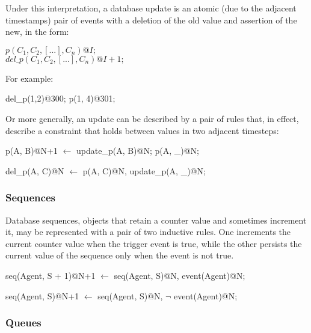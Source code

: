 Under this interpretation, a database update is an atomic (due to the adjacent timestamps)
pair of events with a deletion of the old value and assertion of the new, in the form:

$p(C_{1},C_{2},[...],C_{n})@I;$
\\
$del\_p(C_{1},C_{2},[...],C_{n})@I+1;$

For example:

\begin{Dedalus}
del\_p(1,2)@300; 
p(1, 4)@301;
\end{Dedalus}

Or more generally, an update can be described by a pair of rules that, in effect, describe a
constraint that holds between values in two adjacent timesteps:

\begin{Dedalus}
p(A, B)@N+1 \(\leftarrow\)
  update_p(A, B)@N;
  p(A, _)@N;
  
del_p(A, C)@N \(\leftarrow\)
  p(A, C)@N,
  update_p(A, _)@N;
  
\end{Dedalus}

\subsubsection{Sequences}

Database sequences, objects that retain a counter value and sometimes increment it, may be
represented with a pair of two inductive rules.  One increments the current counter value when the
trigger event is true, while the other persists the current value of the sequence only when the event is 
not true.

\begin{Dedalus}
seq(Agent, S + 1)@N+1 \(\leftarrow\)
  seq(Agent, S)@N, 
  event(Agent)@N; 
  
seq(Agent, S)@N+1 \(\leftarrow\) 
  seq(Agent, S)@N, 
  \(\lnot\) event(Agent)@N;
\end{Dedalus}

\subsubsection{Queues}





